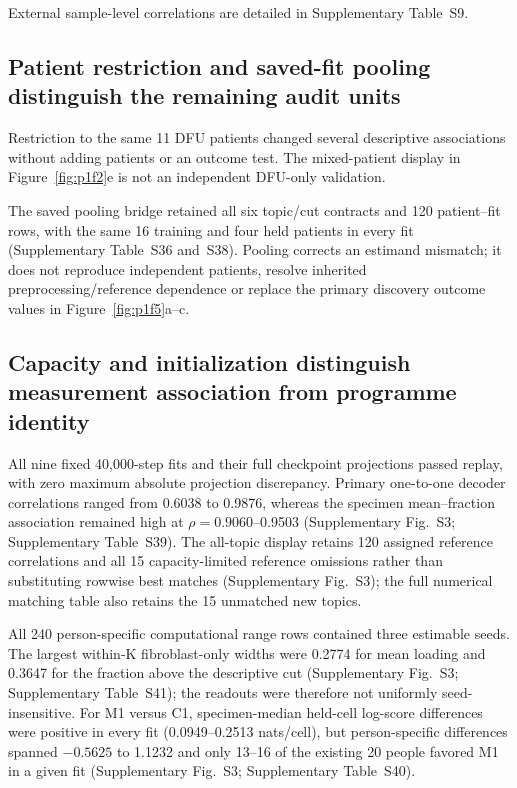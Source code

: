 \documentclass[10pt,a4paper]{article}
\begin{document}
External sample-level correlations are detailed in Supplementary Table~S9.

\subsection{Patient restriction and saved-fit pooling distinguish the remaining audit units}

Restriction to the same 11 DFU patients changed several descriptive associations without adding patients or an outcome test. The mixed-patient display in Figure~\ref{fig:p1f2}e is not an independent DFU-only validation.

The saved pooling bridge retained all six topic/cut contracts and 120 patient--fit rows, with the same 16 training and four held patients in every fit (Supplementary Table~S36 and~S38). Pooling corrects an estimand mismatch; it does not reproduce independent patients, resolve inherited preprocessing/reference dependence or replace the primary discovery outcome values in Figure~\ref{fig:p1f5}a--c.

\subsection{Capacity and initialization distinguish measurement association from programme identity}

All nine fixed 40,000-step fits and their full checkpoint projections passed replay, with zero maximum absolute projection discrepancy. Primary one-to-one decoder correlations ranged from 0.6038 to 0.9876, whereas the specimen mean--fraction association remained high at $\rho=0.9060$--0.9503 (Supplementary Fig.~S3\label{call:p1f10}; Supplementary Table~S39). The all-topic display retains 120 assigned reference correlations and all 15 capacity-limited reference omissions rather than substituting rowwise best matches (Supplementary Fig.~S3); the full numerical matching table also retains the 15 unmatched new topics.



All 240 person-specific computational range rows contained three estimable seeds. The largest within-K fibroblast-only widths were 0.2774 for mean loading and 0.3647 for the fraction above the descriptive cut (Supplementary Fig.~S3; Supplementary Table~S41); the readouts were therefore not uniformly seed-insensitive. For M1 versus C1, specimen-median held-cell log-score differences were positive in every fit (0.0949--0.2513 nats/cell), but person-specific differences spanned $-0.5625$ to 1.1232 and only 13--16 of the existing 20 people favored M1 in a given fit (Supplementary Fig.~S3; Supplementary Table~S40).
\end{document}
